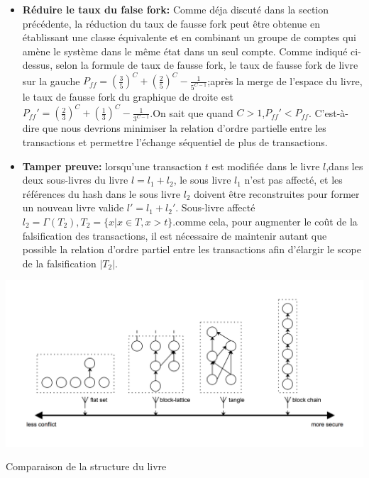 \documentclass[UTF8,nofonts]{article}
\makeatletter
\newenvironment{figurehere}
 {\def\@captype{figure}}
 {}
\makeatother
\begin{document}
\begin{multicols}{2}
\begin{itemize}
	\item \textbf{Réduire le taux du false fork:} Comme déja discuté dans la section précédente, la réduction du taux de fausse fork peut être obtenue en établissant une classe équivalente et en combinant un groupe de comptes qui amène le système dans le même état dans un seul compte. Comme indiqué ci-dessus, selon la formule de taux de fausse fork, le taux de fausse fork de livre sur la gauche $P_{ff}=\left (  \frac{3}{5} \right )^{C} + \left (  \frac{2}{5} \right )^{C} - \frac{1}{5^{C-1}}$;après la merge de l'espace du livre, le taux de fausse fork du graphique de droite est ${P_{ff}}'=\left (  \frac{2}{3} \right )^{C} + \left (  \frac{1}{3} \right )^{C} - \frac{1}{3^{C-1}}$.On sait que quand $C > 1$,${P_{ff}}' < P_{ff}$. C'est-à-dire que nous devrions minimiser la relation d'ordre partielle entre les transactions et permettre l'échange séquentiel de plus de transactions.
	\item \textbf{Tamper preuve:} lorsqu'une transaction $t$ est modifiée dans le livre $l$,dans les deux sous-livres du livre $l = l_{1} + l_{2}$, le sous livre  $l_{1}$ n'est pas affecté, et les références  du hash dans le sous livre $l_{2}$ doivent être reconstruites pour former un nouveau livre valide ${l}' = l_{1} + {l_{2}}'$. Sous-livre affecté $l_{2} = \Gamma(T_{2}),T_{2} = \lbrace x \vert x \in T, x > t \rbrace $.comme cela, pour augmenter le coût de la falsification des transactions, il est nécessaire de maintenir autant que possible la relation d'ordre partiel entre les transactions afin d'élargir le scope de la falsification $\vert T_{2} \vert$.
\end{itemize}

\begin{center}
\begin{figurehere}
\includegraphics[width=\linewidth]{image/ledger-compare.png}
\caption{Comparaison de la structure du livre}
\end{figurehere}
\end{center}


\end{multicols}
\end{document}
